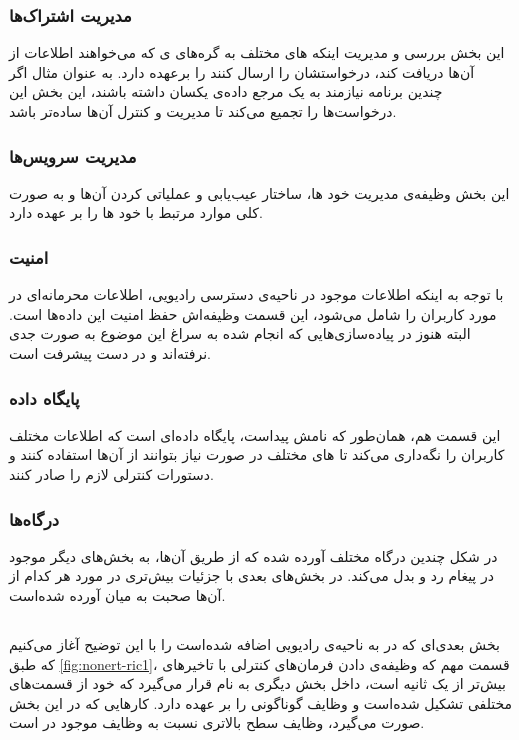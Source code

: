 \documentclass{CSICC}
\begin{document}
\subsubsection{مدیریت اشتراک‌ها}
این بخش بررسی و مدیریت اینکه
های
مختلف به گره‌های
ی
که می‌خواهند اطلاعات از آن‌ها دریافت کند، درخواستشان را ارسال کنند را برعهده دارد. به عنوان مثال اگر چندین برنامه نیازمند به یک مرجع داده‌ی یکسان داشته باشند، این بخش این درخواست‌ها را تجمیع می‌کند تا مدیریت و کنترل‌ آن‌ها ساده‌تر باشد.

\subsubsection{مدیریت سرویس‌ها}
این بخش وظیفه‌ی مدیریت خود
ها،
ساختار عیب‌یابی و عملیاتی کردن آن‌ها و به صورت کلی موارد مرتبط با خود 
ها
را بر عهده دارد.

\subsubsection{امنیت}
با توجه به اینکه اطلاعات موجود در ناحیه‌ی دسترسی رادیویی، اطلاعات محرمانه‌ای در مورد کاربران را شامل می‌شود، این قسمت وظیفه‌اش حفظ امنیت این داده‌ها است. البته هنوز در پیاده‌سازی‌هایی که انجام شده به سراغ این موضوع به صورت جدی نرفته‌اند و در دست پیشرفت است.

\subsubsection{پایگاه داده}
این قسمت هم، همان‌طور که نامش پیداست،‌ پایگاه داده‌ای است که اطلاعات مختلف کاربران را نگه‌داری می‌کند تا 
های
مختلف در صورت نیاز بتوانند از آن‌ها استفاده کنند و دستورات کنترلی لازم را صادر کنند.


\subsubsection{درگاه‌ها}
در شکل چندین درگاه مختلف آورده شده که از طریق آن‌ها،
به بخش‌های دیگر موجود در 
پیغام رد و بدل می‌کند. در بخش‌های بعدی با جزئیات بیش‌تری در مورد هر کدام از آن‌ها صحبت به میان آورده شده‌است.

\subsection{}

بخش بعدی‌ای که در 
به ناحیه‌ی رادیویی اضافه شده‌است را با این توضیح آغاز می‌کنیم که طبق 
\ref{fig:nonert-ric1}،
قسمت مهم 
که وظیفه‌ی دادن فرمان‌های کنترلی با تاخیرهای بیش‌تر از یک ثانیه است، داخل بخش دیگری به نام
قرار می‌گیرد که خود از قسمت‌های مختلفی تشکیل شده‌است و وظایف گوناگونی را بر عهده دارد. کارهایی که در این بخش صورت می‌گیرد، وظایف سطح بالاتری نسبت به وظایف موجود در 
است.
\end{document}
